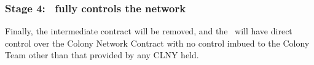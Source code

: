 \subsubsection*{Stage 4: \rc\ fully controls the network}
Finally, the intermediate contract will be removed, and the \rc\ will have direct control over the Colony Network Contract with no control imbued to the Colony Team other than that provided by any CLNY held. 

